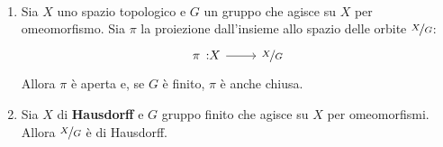 \begin{proposition}\label{proiezione azione gruppo aperta}~{}\\
\begin{enumerate}
\item Sia $X$ uno spazio topologico e $G$ un gruppo che agisce su $X$ per omeomorfismo. Sia $\pi$ la proiezione dall'insieme allo spazio delle orbite $\nicefrac{X}{G}$:
	\begin{equation}
		\funz{\pi}{X}{\nicefrac{X}{G}}
	\end{equation}
Allora $\pi$ è aperta e, se $G$ è finito, $\pi$ è anche chiusa.
\item Sia $X$ di \textbf{Hausdorff} e $G$ gruppo finito che agisce su $X$ per omeomorfismi. Allora $\nicefrac{X}{G}$ è di Hausdorff.
\end{enumerate}
\vspace{-3mm}
\end{proposition}
